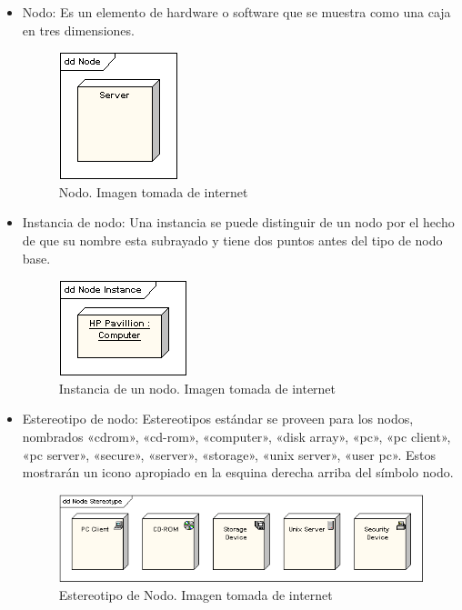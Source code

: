 \begin{itemize}
\item Nodo: Es un elemento de hardware o software que se muestra como una caja en tres dimensiones.
\begin{figure}[H]
	\centering
	\includegraphics[width=0.5\linewidth]{diseno/nodos/imgs/1}
	\caption{Nodo. Imagen tomada de internet}
	\label{fig:gantt}
\end{figure}

\item Instancia de nodo: Una instancia se puede distinguir de un nodo por el hecho de que su nombre esta subrayado y tiene dos puntos antes del tipo de nodo base. 
\begin{figure}[H]
	\centering
	\includegraphics[width=0.5\linewidth]{diseno/nodos/imgs/2}
	\caption{Instancia de un nodo. Imagen tomada de internet}
	\label{fig:gantt}
\end{figure}

\item Estereotipo de nodo: Estereotipos estándar se proveen para los nodos, nombrados «cdrom», «cd-rom», «computer», «disk array», «pc», «pc client», «pc server», «secure», «server», «storage», «unix server», «user pc». Estos mostrarán un icono apropiado en la esquina derecha arriba del símbolo nodo.

\begin{figure}[H]
	\centering
	\includegraphics[width=0.7\linewidth]{diseno/nodos/imgs/3}
	\caption{Estereotipo de Nodo. Imagen tomada de internet}
	\label{fig:gantt}
\end{figure}


\end{itemize}
